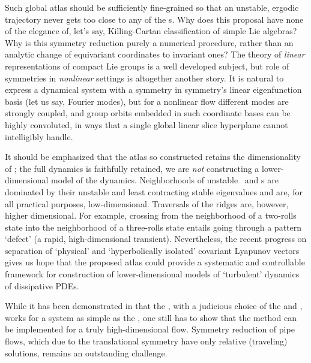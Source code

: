 Such global atlas should be sufficiently fine-grained so that an unstable,
ergodic trajectory never gets too close to any of the {\sset s}.
Why does this proposal have none of the elegance of, let's say,
Killing-Cartan classification of simple Lie algebras?
Why is this symmetry reduction purely a numerical procedure, rather
than an analytic change of equivariant coordinates to invariant ones?
The theory of \emph{linear} representations of compact Lie groups is a well
developed subject,
but role of symmetries in \emph{nonlinear} settings is
altogether another story. It is natural to express a dynamical system
with a symmetry in symmetry's linear eigenfunction basis (let  us say,
Fourier modes), but for a nonlinear flow different modes are strongly coupled,
and group orbits embedded in such coordinate bases can be highly convoluted,
in ways that a single global linear slice hyperplane cannot intelligibly handle.

It should be emphasized that the atlas so constructed retains the dimensionality of
\reducedsp; the full dynamics is faithfully retained, we are \emph{not}
constructing a lower-dimensional model of the dynamics. Neighborhoods of
unstable \eqva\ and \po s are dominated by their unstable and least
contracting stable eigenvalues and are, for all practical purposes,
low-dimensional. Traversals of the ridges are, however, higher
dimensional. For example, crossing from the neighborhood of a two-rolls
state into the neighborhood of a three-rolls state entails going through
a pattern `defect' (a rapid, high-dimensional transient). Nevertheless,
the recent progress on separation of `physical' and `hyperbolically
isolated' covariant Lyapunov
vectors gives us
hope that the proposed atlas could provide a systematic and controllable
framework for construction of lower-dimensional models of `turbulent'
dynamics of dissipative PDEs.

While it has been demonstrated in   that the
\mslices, with a judicious choice of the
{\template} and {\PoincSec}, works for a system as simple as the \cLf,
one still has to show that the method can be implemented for a
truly high-dimensional flow. Symmetry reduction of pipe flows,
which due to the translational symmetry have only relative (traveling)
solutions, remains an outstanding challenge.
